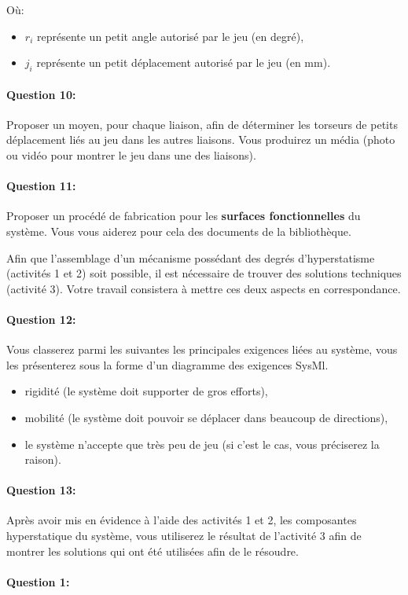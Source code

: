 Où:
\begin{itemize}
 \item $r_i$ représente un petit angle autorisé par le jeu (en degré),
 \item $j_i$ représente un petit déplacement autorisé par le jeu (en mm). 
\end{itemize}

\paragraph{Question 10:} Proposer un moyen, pour chaque liaison, afin de déterminer les torseurs de petits déplacement liés au jeu dans les autres liaisons. Vous produirez un média (photo ou vidéo pour montrer le jeu dans une des liaisons).

\paragraph{Question 11:} Proposer un procédé de fabrication pour les \textbf{surfaces fonctionnelles} du système. Vous vous aiderez pour cela des documents de la bibliothèque.

\cleardoublepage


Afin que l'assemblage d'un mécanisme possédant des degrés d'hyperstatisme (activités 1 et 2) soit possible, il est nécessaire de trouver des solutions techniques (activité 3). Votre travail consistera à mettre ces deux aspects en correspondance.

\paragraph{Question 12:} Vous classerez parmi les suivantes les principales exigences liées au système, vous les présenterez sous la forme d'un diagramme des exigences SysMl.

\begin{itemize}
 \item rigidité (le système doit supporter de gros efforts),
 \item mobilité (le système doit pouvoir se déplacer dans beaucoup de directions),
 \item le système n'accepte que très peu de jeu (si c'est le cas, vous préciserez la raison).
\end{itemize}

\paragraph{Question 13:} Après avoir mis en évidence à l'aide des activités 1 et 2, les composantes hyperstatique du système, vous utiliserez le résultat de l'activité 3 afin de montrer les solutions qui ont été utilisées afin de le résoudre.




\pagestyle{correction}\setcounter{section}{0}

\paragraph{Question 1:}
